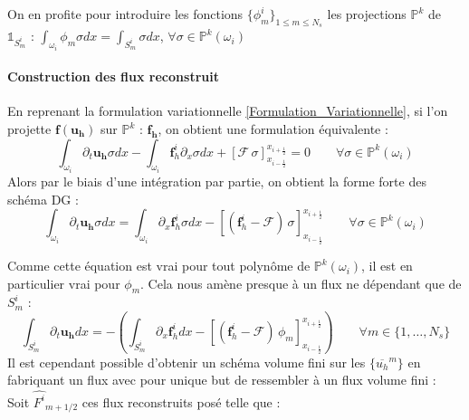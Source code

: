 On en profite pour introduire les fonctions $\{\phi_m^i\}_{1\leq m\leq N_s}$ les projections $\mathbb{P}^k$ de $\mathbb{1}_{S^i_m}$ : 
$\int_{\omega_i} \phi_m \sigma dx = \int_{S_m^i} \sigma dx$, $\forall \sigma \in \mathbb{P}^k(\omega_i)$

\paragraph{ Construction des flux reconstruit \\}

En reprenant la formulation variationnelle \eqref{Formulation_Variationnelle}, si l'on projette $\mathbf{f}(\mathbf{u_h})$ sur $\mathbb{P}^k$ : $\mathbf{f_h}$, on obtient une formulation équivalente : 
$$\int_{\omega_i} \partial_t \mathbf{u_h} \sigma dx - \int_{\omega_i} \mathbf{f}_h^i \partial_x \sigma dx 
+ \left[ \mathcal{F}\, \sigma \right]_{x_{i-\frac{1}{2}}}^{x_{i+\frac{1}{2}}} = 0 \qquad \forall  \sigma \in \mathbb{P}^k(\omega_i) $$  
Alors par le biais d'une intégration par partie, on obtient la forme forte des schéma DG :  
$$\int_{\omega_i} \partial_t \mathbf{u_h} \sigma dx = \int_{\omega_i} \partial_x \mathbf{f}_h^i  \sigma dx 
- \left[ ( \mathbf{f}_h^i - \mathcal{F} )\, \sigma \right]_{x_{i-\frac{1}{2}}}^{x_{i+\frac{1}{2}}} \qquad \forall  \sigma \in \mathbb{P}^k(\omega_i) $$  

Comme cette équation est vrai pour tout polynôme de $\mathbb{P}^k(\omega_i)$, il est en particulier vrai pour $\phi_m$. Cela nous amène presque à un flux ne dépendant que de $S_m^i$ : 
\begin{equation}
    \int_{S_m^i} \partial_t \mathbf{u_h} dx = - \left(\int_{S_m^i}  \partial_x \mathbf{f}_h^i dx - \left[ ( \mathbf{f}_h^i - \mathcal{F} )\, \phi_m \right]_{x_{i-\frac{1}{2}}}^{x_{i+\frac{1}{2}}}\right) \qquad \forall m\in \{ 1, \dots, N_s\}
\end{equation}
Il est cependant possible d'obtenir un schéma volume fini sur les $\{\overline{u_h}^m\}$ en fabriquant un flux avec pour unique but de ressembler à un flux volume fini : \\
Soit $\widehat{F^i}_{m+1/2}$ ces flux reconstruits posé telle que : 

